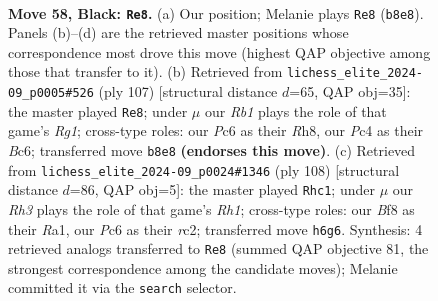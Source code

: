 \documentclass[11pt]{article}
\begin{document}
\begin{figure}[p]\centering
\begin{subfigure}{0.46\textwidth}\centering
\resizebox{\linewidth}{!}{%
\newchessgame
\chessboard[
  setfen={1r3b2/1k4p1/p1p4r/Pp1b1p1p/2p2P1P/2B1P1P1/1P1K3N/1R4R1 b - - 18 58},
  showmover=false,
  pgfstyle=straightmove, color=movearrow, markmove={b8-e8}
]}
\caption{}
\end{subfigure}\hfill
\begin{subfigure}{0.46\textwidth}\centering
\resizebox{\linewidth}{!}{%
\newchessgame
\chessboard[
  setfen={6rr/5p2/1kb1p1p1/1p1pP2p/pP3P2/P1P1R1P1/4B2P/2KR4 b - - 48 54},
  showmover=false,
  pgfstyle=straightmove, color=movearrow, markmove={g8-e8}
]}
\caption{}
\end{subfigure}
\\[4pt]
\begin{subfigure}{0.46\textwidth}\centering
\resizebox{\linewidth}{!}{%
\newchessgame
\chessboard[
  setfen={2k5/2p2p2/2pr2p1/p5Pp/P2BPK1P/1bP2P2/2r5/R6R w - - 59 55},
  showmover=false,
  pgfstyle=straightmove, color=movearrow, markmove={h1-c1}
]}
\caption{}
\end{subfigure}\hfill

\caption{\textbf{Move 58, Black: \texttt{Re8}.} (a) Our position; Melanie plays \texttt{Re8} (\texttt{b8e8}). Panels (b)--(d) are the retrieved master positions whose correspondence most drove this move (highest QAP objective among those that transfer to it). (b) Retrieved from \texttt{lichess\_elite\_2024-09\_p0005\#526} (ply 107) [structural distance $d$=65, QAP obj=35]: the master played \texttt{Re8}; under $\mu$ our \emph{Rb1} plays the role of that game's \emph{Rg1}; cross-type roles: our \emph{P}c6 as their \emph{R}h8, our \emph{P}c4 as their \emph{B}c6; transferred move \texttt{b8e8} \textbf{(endorses this move)}. (c) Retrieved from \texttt{lichess\_elite\_2024-09\_p0024\#1346} (ply 108) [structural distance $d$=86, QAP obj=5]: the master played \texttt{Rhc1}; under $\mu$ our \emph{Rh3} plays the role of that game's \emph{Rh1}; cross-type roles: our \emph{B}f8 as their \emph{R}a1, our \emph{P}c6 as their \emph{r}c2; transferred move \texttt{h6g6}. Synthesis: 4 retrieved analogs transferred to \texttt{Re8} (summed QAP objective 81, the strongest correspondence among the candidate moves); Melanie committed it via the \texttt{search} selector.}
\label{fig:thought-m115}
\end{figure}

\clearpage
\end{document}
